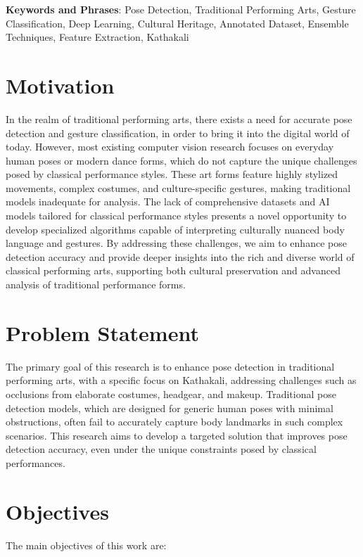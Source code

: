 \textbf{Keywords and Phrases}: Pose Detection, Traditional Performing Arts, Gesture Classification, Deep Learning, Cultural Heritage, Annotated Dataset, Ensemble Techniques, Feature Extraction, Kathakali


\clearpage

\section{Motivation}

In the realm of traditional performing arts, there exists a need for accurate pose detection and gesture classification, in order to bring it into the digital world of today. However, most existing computer vision research focuses on everyday human poses or modern dance forms, which do not capture the unique challenges posed by classical performance styles. These art forms feature highly stylized movements, complex costumes, and culture-specific gestures, making traditional models inadequate for analysis. The lack of comprehensive datasets and AI models tailored for classical performance styles presents a novel opportunity to develop specialized algorithms capable of interpreting culturally nuanced body language and gestures. By addressing these challenges, we aim to enhance pose detection accuracy and provide deeper insights into the rich and diverse world of classical performing arts, supporting both cultural preservation and advanced analysis of traditional performance forms.

\section{Problem Statement}
The primary goal of this research is to enhance pose detection in traditional performing arts, with a specific focus on Kathakali, addressing challenges such as occlusions from elaborate costumes, headgear, and makeup. Traditional pose detection models, which are designed for generic human poses with minimal obstructions, often fail to accurately capture body landmarks in such complex scenarios. This research aims to develop a targeted solution that improves pose detection accuracy, even under the unique constraints posed by classical performances.

\section{Objectives}
The main objectives of this work are:

